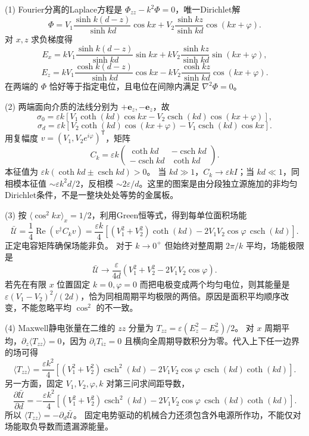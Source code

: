(1) Fourier分离的Laplace方程是 \(\Phi_{zz}-k^2\Phi=0\)，唯一Dirichlet解
\[
\Phi=V_1\frac{\sinh k(d-z)}{\sinh kd}\cos kx+
V_2\frac{\sinh kz}{\sinh kd}\cos(kx+\varphi).
\]
对 \(x,z\) 求负梯度得
\[
E_x=kV_1\frac{\sinh k(d-z)}{\sinh kd}\sin kx+
kV_2\frac{\sinh kz}{\sinh kd}\sin(kx+\varphi),
\]
\[
E_z=kV_1\frac{\cosh k(d-z)}{\sinh kd}\cos kx-
kV_2\frac{\cosh kz}{\sinh kd}\cos(kx+\varphi).
\]
在两端的 \(\Phi\) 恰好等于指定电位，且电位在间隙内满足 \(\nabla^2\Phi=0\)。

(2) 两端面向介质的法线分别为 \(+\mathbf e_z,-\mathbf e_z\)，故
\[
\sigma_0=\varepsilon k[V_1\coth(kd)\cos kx-
V_2\operatorname{csch}(kd)\cos(kx+\varphi)],
\]
\[
\sigma_d=\varepsilon k[V_2\coth(kd)\cos(kx+\varphi)-
V_1\operatorname{csch}(kd)\cos kx].
\]
用复幅度 \(v=(V_1,V_2e^{i\varphi})^\mathsf T\)，矩阵
\[
C_k=\varepsilon k
\begin{pmatrix}\coth kd&-\operatorname{csch}kd\\
-\operatorname{csch}kd&\coth kd\end{pmatrix}.
\]
本征值为 \(\varepsilon k(\coth kd\pm\operatorname{csch}kd)>0\)。
当 \(kd\gg1\)，\(C_k\to\varepsilon kI\)；当 \(kd\ll1\)，同相模本征值 \(\sim\varepsilon k^2d/2\)，反相模 \(\sim 2\varepsilon/d\)。这里的图案是由分段独立源施加的非均匀Dirichlet条件，不是一整块处处等势的金属板。

(3) 按 \(\langle\cos^2kx\rangle_x=1/2\)，利用Green恒等式，得到每单位面积场能
\[
\boxed{\bar{\mathcal U}
=\frac14\operatorname{Re}(v^\dagger C_kv)
=\frac{\varepsilon k}{4}
[(V_1^2+V_2^2)\coth(kd)-2V_1V_2\cos\varphi\,\operatorname{csch}(kd)]}.
\]
正定电容矩阵确保场能非负。
对于 \(k\to0^+\) 但始终对整周期 \(2\pi/k\) 平均，场能极限是
\[
\bar{\mathcal U}\to\frac{\varepsilon}{4d}
(V_1^2+V_2^2-2V_1V_2\cos\varphi).
\]
若先在有限 \(x\) 位置固定 \(k=0,\varphi=0\) 而把电极变成两个均匀电位，则其能量是 \(\varepsilon(V_1-V_2)^2/(2d)\)，恰为同相周期平均极限的两倍。原因是面积平均顺序改变，不能忽略平均 \(\cos^2\) 的不一致。

(4) Maxwell静电张量在二维的 \(zz\) 分量为
\(T_{zz}=\varepsilon(E_z^2-E_x^2)/2\)。
对 \(x\) 周期平均，\(\partial_z\langle T_{zz}\rangle=0\)，因为 \(\partial_iT_{iz}=0\) 且横向全周期导数积分为零。代入上下任一边界的场可得
\[
\langle T_{zz}\rangle
=\frac{\varepsilon k^2}{4}[
(V_1^2+V_2^2)\operatorname{csch}^2(kd)
-2V_1V_2\cos\varphi\,\operatorname{csch}(kd)\coth(kd)].
\]
另一方面，固定 \(V_1,V_2,\varphi,k\) 对第三问求间距导数，
\[
\frac{\partial\bar{\mathcal U}}{\partial d}
=-\frac{\varepsilon k^2}{4}[
(V_1^2+V_2^2)\operatorname{csch}^2(kd)
-2V_1V_2\cos\varphi\,\operatorname{csch}(kd)\coth(kd)].
\]
所以 \(\langle T_{zz}\rangle=-\partial_d\bar{\mathcal U}\)。
固定电势驱动的机械合力还须包含外电源所作功，不能仅对场能取负导数而遗漏源能量。
